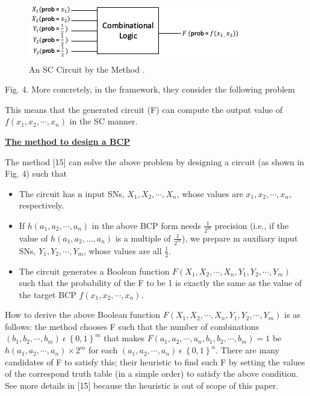 \documentclass[10pt,conference]{IEEEtran}
\begin{document}
\begin{figure}[ht]
    \setcounter{figure}{3}
    \includegraphics[width=.45\textwidth]{fig4.png}
    \caption{ An SC Circuit by the Method \cite{fifteen}.}
\end{figure}
Fig. 4. More concretely, in the framework, they consider the following problem


This means that the generated circuit (F) can compute the
output value of $f(x_1, x_2, \cdots , x_n)$ in the SC manner.

\noindent
\underline{\textbf{The method \cite{fifteen} to design a BCP}}
\par
The method [15] can solve the above problem by designing
a circuit (as shown in Fig. 4) such that \\
\begin{itemize}
  \item The circuit has n input SNs, $X_1, X_2, \cdots , X_n$, whose
values are $x_1, x_2, \cdots , x_n,$ respectively.
  \item If $h(a_1, a_2, \cdots , a_n)$ in the above BCP form needs $\frac{1}{2^m}$ precision (i.e., if the value of $h(a_1, a_2, ... , a_n)$ is a multiple of $\frac{1}{2^m}$), we prepare m auxiliary input SNs, $Y_1, Y_2, \cdots , Y_m$, whose values are all $\frac{1}{2}$.
  \item The circuit generates a Boolean function $F(X_1, X_2, \cdots , X_n, Y_1, Y_2, \cdots , Y_m)$ such that the probability of the F to be 1 is exactly the same as the value of the target BCP $f(x_1, x_2, \cdots , x_n)$.

\end{itemize}

\par
How to derive the above Boolean function
$F(X_1, X_2, \cdots , X_n, Y_1, Y_2, \cdots , Y_m)$ is as follows:
the method chooses F such that the number
of combinations $(b_1, b_2, \cdots , b_m)   \:\epsilon\:   \left \{ 0,1 \right \}^m$ that
makes $F(a_1, a_2, \cdots , a_n, b_1, b_2, \cdots , b_m) = 1$ be
$h(a_1, a_2, \cdots , a_n) \times 2^m$ for each $(a_1, a_2, \cdots , a_n) \:\epsilon\:   \left \{ 0,1 \right \}^n$.
There are many candidates of F to satisfy this; their heuristic
to find such F by setting the values of the correspond truth
table (in a simple order) to satisfy the above condition. See
more details in [15] because the heuristic is out of scope of
this paper.
\end{document}
